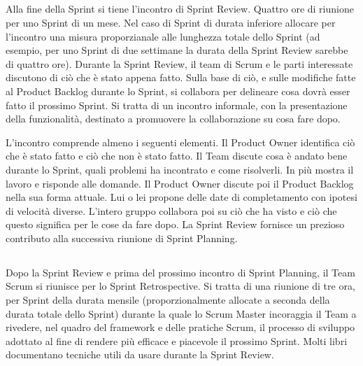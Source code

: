 
\subsection*{\color{Blue}{SPRINT REVIEW}}
\label{sec:sprintreview}
Alla fine della Sprint si tiene l'incontro di Sprint Review. Quattro ore di riunione per uno Sprint di un mese. Nel
caso di Sprint di durata inferiore allocare per l'incontro una misura proporzianale alle lunghezza totale dello Sprint
(ad esempio, per uno Sprint di due settimane la durata della Sprint Review sarebbe di quattro ore). Durante la Sprint Review, il
team di Scrum e le parti interessate discutono di ci\`o che \`e stato appena fatto. Sulla base di ci\`o, e sulle modifiche fatte al Product Backlog durante lo Sprint, si collabora per delineare cosa dovr\`a esser fatto il prossimo Sprint. Si
tratta di un incontro informale, con la presentazione della funzionalit\`a, destinato a promuovere la collaborazione su
cosa fare dopo. 
\newline

L'incontro comprende almeno i seguenti elementi. Il Product Owner identifica ci\`o che \`e stato fatto e ci\`o che non
\`e stato fatto. Il Team discute cosa \`e andato bene durante lo Sprint, quali problemi ha incontrato e come
risolverli. In pi\`u mostra il lavoro e risponde alle domande. Il Product Owner discute poi il Product
Backlog nella sua forma attuale. Lui o lei propone delle date di completamento con ipotesi di velocit\`a diverse.
L'intero gruppo collabora poi su ci\`o che ha visto e ci\`o che questo significa per le cose da fare dopo. La Sprint
Review fornisce un prezioso contributo alla successiva riunione di Sprint Planning.

\subsection*{\color{Blue}{SPRINT RETROSPECTIVE}}
\label{sec:sprintretrospective}
Dopo la Sprint Review e prima del prossimo incontro di Sprint Planning, il Team Scrum si riunisce per lo Sprint
Retrospective. Si tratta di una riunione di tre ora, per Sprint della durata mensile (proporzionalmente allocate a seconda della durata totale dello Sprint) durante la quale lo Scrum Master incoraggia il Team a rivedere, nel quadro del framework e
delle pratiche Scrum, il processo di sviluppo adottato al fine di rendere pi\`u efficace e piacevole il prossimo Sprint.
Molti libri documentano tecniche utili da usare durante la Sprint Review.
\newline

